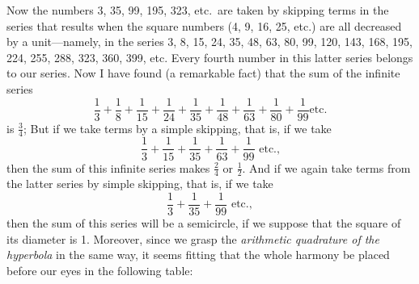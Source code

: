\documentclass[polutonikogreek,english,twoside,openright]{article}
\begin{document}
\noindent Now the numbers 3, 35, 99, 195, 323, etc.\ are taken by
skipping terms in the series that results when the square numbers (4,
9, 16, 25, etc.) are all decreased by a unit---namely, in the series
3, 8, 15, 24, 35, 48, 63, 80, 99, 120, 143, 168, 195, 224, 255, 288,
323, 360, 399, etc. Every fourth number in this latter series belongs
to our series.  Now I have found (a remarkable fact) that the sum of
the infinite series
$$\frac{1}{3} +
\frac{1}{8} + \frac{1}{15} + \frac{1}{24} + \frac{1}{35} +
\frac{1}{48} + \frac{1}{63} + \frac{1}{80} + \frac{1}{99}\mbox{
  etc.}$$ is $\frac{3}{4}$;
But if we take terms by a simple skipping, that is, if we take
$$\frac{1}{3} + \frac{1}{15} +
\frac{1}{35} + \frac{1}{63} + \frac{1}{99}\mbox{ etc.,}$$ then the sum
of this infinite series makes $\frac{2}{4}$ or
$\frac{1}{2}$. And if we again
take terms from the latter series by simple skipping, that is, if we
take
  $$\frac{1}{3} + \frac{1}{35} + \frac{1}{99}\mbox{ etc.},$$ 
  then the sum of this series will be a semicircle, if we suppose that
  the square of its diameter is 1.  Moreover, since we grasp the {\em
    arithmetic quadrature of the hyperbola} in the same way, it seems
  fitting that the whole harmony be placed before our eyes in the
  following table: \vspace{1.25ex}
  
\end{document}
